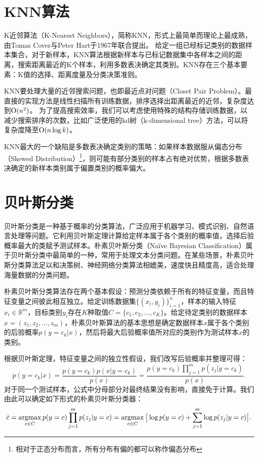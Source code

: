 \section{KNN算法}
K近邻算法（K-Nearest Neighbors），简称KNN，形式上最简单而理论上最成熟，由Tomas Cover与Peter Hart于1967年联合提出\cite{cover1967nearest}。 给定一组已经标记类别的数据样本集合，对于新样本，KNN算法根据新样本与已标记数据集中各样本之间的距离，搜索距离最近的K个样本，利用多数表决确定其类别。KNN存在三个基本要素：K值的选择、距离度量及分类决策准则。

KNN要处理大量的近邻搜索问题，也即最近点对问题（Closet Pair Problem）。最直接的实现方法是线性扫描所有训练数据，排序选择出距离最近的近邻，复杂度达到$\operatorname{\mathrm{O}}(n^2)$。 为了提高搜索效率，我们可以考虑使用特殊的结构存储训练数据，以减少搜索排序的次数，比如广泛使用的kd树（k-dimensional tree）方法\cite{bentley1975multidimensional}，可以将复杂度降至$\operatorname{\mathrm{O}}(n\log k)$。

KNN最大的一个缺陷是多数表决确定类别的策略：如果样本数据服从偏态分布（Skewed Distribution）\footnote{相对于正态分布而言，所有分布有偏的都可以称作偏态分布}，则可能有部分类别的样本占有绝对优势，根据多数表决确定的新样本类别属于偏置类别的概率偏大。

\section{贝叶斯分类}
贝叶斯分类是一种基于概率的分类算法，广泛应用于机器学习、模式识别、自然语言处理等问题。它利用贝叶斯定理计算给定样本属于各个类别的概率值，选择后验概率最大的类赋予测试样本。朴素贝叶斯分类（Na\"{i}ve Bayesian Classification）属于贝叶斯分类中最简单的一种，常用于处理文本分类问题。在某些场景，朴素贝叶斯分类算法足以和决策树、神经网络分类算法相媲美，速度快且精度高，适合处理海量数据的分类问题。

朴素贝叶斯分类算法存在两个基本假设：预测分类依赖于所有的特征变量，而且特征变量之间彼此相互独立。给定训练数据集$\{(x_i,y_i)\}_{i=1}^n$，样本的输入特征$x_i\in\mathbb R^m$，目标类别$y_i$存在$K$种取值$C = \{c_1, c_2, \ldots, c_K\}$。给定待定类别的数据样本$x = (z_1, z_2, \ldots, z_m)$，朴素贝叶斯算法的基本思想是确定数据样本$x$属于各个类别的后验概率$p(y = c_k|x)$，然后将最大后验概率值所对应的类别作为测试样本$x$的类别。

根据贝叶斯定理，特征变量之间的独立性假设，我们改写后验概率并整理可得：
\begin{equation}
    p(y = c_k|x) = \frac{p(y = c_k)p(x|y = c_k)}{p(x)} = \frac{p(y = c_k)\prod\limits_{j=1}^m p(z_j|y = c_k)}{p(x)}.
\end{equation}
对于同一个测试样本，公式中分母部分对最终结果没有影响，直接免于计算。我们由此可以确定如下形式的朴素贝叶斯分类器：
\begin{equation}\label{eq:nbc}
    \hat c = \operatorname*{\mathrm{\arg\!\max}}\limits_{c\in C} p(y = c)\prod\limits_{j=1}^m p(z_j|y = c) = \operatorname*{\mathrm{\arg\!\max}}\limits_{c\in C} \big[\log p(y = c) + \sum\limits_{j=1}^m \log p(z_j|y = c)\big].
\end{equation}

